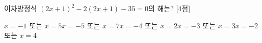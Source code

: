 이차방정식 $(2x+1)^2-2(2x+1)-35=0$의 해는? \mbox{[4점]}
\begin{choicesii}{$x=-1$ 또는 $x=5$}{$x=-5$ 또는 $x=7$}{$x=-4$ 또는 $x=2$}{$x=-3$ 또는 $x=3$}{$x=-2$ 또는 $x=4$}\end{choicesii}
